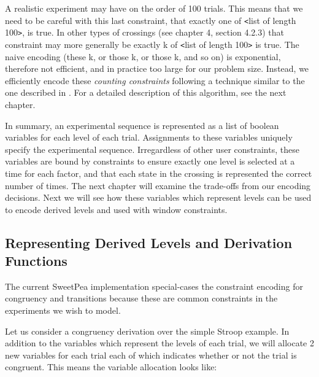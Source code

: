 A realistic experiment may have on the order of 100 trials. This means that we need to be careful with this last constraint, that exactly one of \texttt{<}list of length 100\texttt{>}, is true. In other types of crossings (see chapter 4, section 4.2.3) that constraint may more generally be exactly k of \texttt{<}list of length 100\texttt{>} is true. The naive encoding (these k, or those k, or those k, and so on) is exponential, therefore not efficient, and in practice too large for our problem size. Instead, we efficiently encode these \emph{counting constraints} following a technique similar to the one described in \cite{sinz2005towards}. For a detailed description of this algorithm, see the next chapter.

In summary, an experimental sequence is represented as a list of boolean variables for each level of each trial. Assignments to these variables uniquely specify the experimental sequence. Irregardless of other user constraints, these variables are bound by constraints to ensure exactly one level is selected at a time for each factor, and that each state in the crossing is represented the correct number of times. The next chapter will examine the trade-offs from our encoding decisions. Next we will see how these variables which represent levels can be used to encode derived levels and used with window constraints.

\subsection{Representing Derived Levels and Derivation Functions}

The current SweetPea implementation special-cases the constraint encoding for congruency and transitions because these are common constraints in the experiments we wish to model.

Let us consider a congruency derivation over the simple Stroop example. In addition to the variables which represent the levels of each trial, we will allocate 2 new variables for each trial each of which indicates whether or not the trial is congruent. This means the variable allocation looks like:






